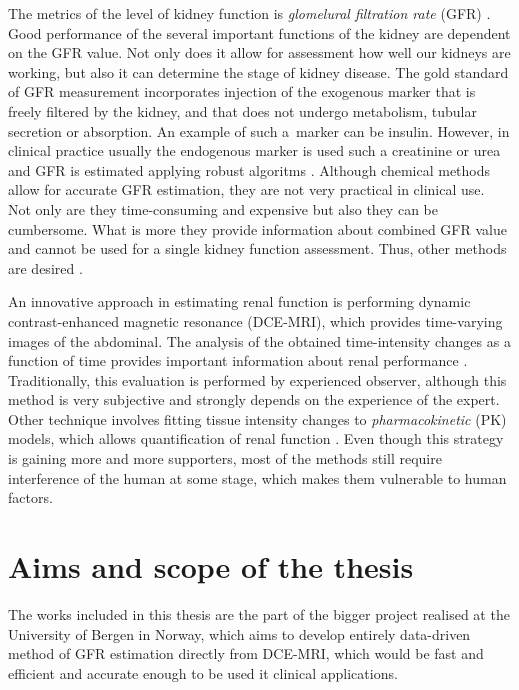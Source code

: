 The metrics of the level of kidney function is \textit{glomelural filtration rate} (GFR) \cite{traynor2006measure}. Good performance of the several important functions of the kidney are dependent on the GFR value. Not only does it allow for assessment how well our kidneys are working, but also it can determine the stage of kidney disease.
The gold standard of GFR measurement incorporates injection of the exogenous marker that is freely filtered by the kidney, and that does not undergo metabolism, tubular secretion or absorption. An example of such a~marker can be insulin.
However, in clinical practice usually the endogenous marker is used such a creatinine or urea and GFR is estimated applying robust algoritms \cite{delanaye2012measuring}.
Although chemical methods allow for accurate GFR estimation, they are not very practical in clinical use. Not only are they time-consuming and expensive but also they can be cumbersome. What is more they provide information about combined GFR value and cannot be used for a single kidney function assessment. Thus, other methods are desired \cite{bokacheva2008assessment}.

An innovative approach in estimating renal function is performing dynamic contrast-enhanced magnetic resonance (DCE-MRI), which provides time-varying images of the abdominal.
The analysis of the obtained time-intensity changes as a function of time provides important information about renal performance \cite{bokacheva2008assessment, khalifa2014models}. Traditionally, this evaluation is performed by experienced observer, although this method is very subjective and strongly depends on the experience of the expert. Other technique involves fitting tissue intensity changes to \textit{pharmacokinetic} (PK) models, which allows quantification of renal function \cite{khalifa2014models}. Even though this strategy is gaining more and more supporters, most of the methods still require interference of the human at some stage, which makes them vulnerable to human factors. 

\section{Aims and scope of the thesis}
The works included in this thesis are the part of the bigger project realised at the University of Bergen in Norway, which aims to develop entirely data-driven method of GFR estimation directly from DCE-MRI, which would be fast and efficient and accurate enough to be used it clinical applications.  
 
